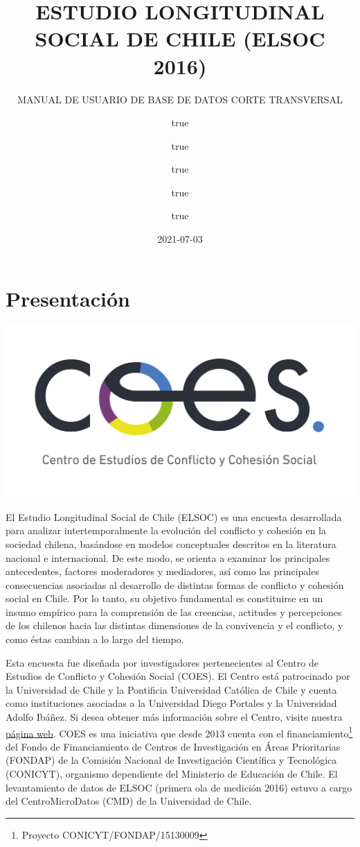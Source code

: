 \documentclass[
]{book}
\title{ESTUDIO LONGITUDINAL SOCIAL DE CHILE (ELSOC 2016)}
\subtitle{MANUAL DE USUARIO DE BASE DE DATOS CORTE TRANSVERSAL}
\author{true \and true \and true \and true \and true}
\date{2021-07-03}
\begin{document}
\maketitle

{
\setcounter{tocdepth}{1}
\tableofcontents
}
\hypertarget{present}{%
\chapter{Presentación}\label{present}}

\begin{center}\includegraphics[width=0.6\linewidth,height=0.6\textheight]{imagenes/coes_blanco_esp} \end{center}

El Estudio Longitudinal Social de Chile (ELSOC) es una encuesta desarrollada para analizar intertemporalmente la evolución del conflicto y cohesión en la sociedad chilena, basándose en modelos conceptuales descritos en la literatura nacional e internacional. De este modo, se orienta a examinar los principales antecedentes, factores moderadores y mediadores, así como las principales consecuencias asociadas al desarrollo de distintas formas de conflicto y cohesión social en Chile. Por lo tanto, su objetivo fundamental es constituirse en un insumo empírico para la comprensión de las creencias, actitudes y percepciones de los chilenos hacia las distintas dimensiones de la convivencia y el conflicto, y como éstas cambian a lo largo del tiempo.

Esta encuesta fue diseñada por investigadores pertenecientes al Centro de Estudios de Conflicto y Cohesión Social (COES). El Centro está patrocinado por la Universidad de Chile y la Pontificia Universidad Católica de Chile y cuenta como instituciones asociadas a la Universidad Diego Portales y la Universidad Adolfo Ibáñez. Si desea obtener más información sobre el Centro, visite nuestra \href{http://www.coes.cl/}{página web}. COES es una iniciativa que desde 2013 cuenta con el financiamiento\footnote{Proyecto CONICYT/FONDAP/15130009} del Fondo de Financiamiento de Centros de Investigación en Áreas Prioritarias (FONDAP) de la Comisión Nacional de Investigación Científica y Tecnológica (CONICYT), organismo dependiente del Ministerio de Educación de Chile. El levantamiento de datos de ELSOC (primera ola de medición 2016) estuvo a cargo del CentroMicroDatos (CMD) de la Universidad de Chile.
\end{document}

